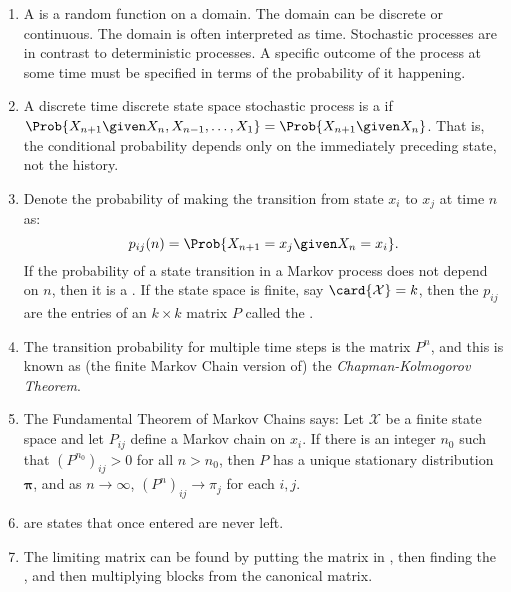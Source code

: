 \documentclass[12pt]{article}
\begin{document}
\begin{enumerate}
    \item
        A  is%
        a random function on a domain.  The domain can be discrete or
        continuous.  The domain is often interpreted as time.  Stochastic
        processes are in contrast to deterministic processes.  A specific
        outcome of the process at some time must be specified in terms of
        the probability of it happening.
    \item
        A discrete time discrete state space stochastic process is a
         if \( \Prob{X_{n+1} \given X_n, X_{n-1},
        \dots, X_1} = \Prob{X_{n+1} \given X_n} \).  That is, the
        conditional probability depends only on the immediately
        preceding state, not the history.
    \item
        Denote the probability of making the transition from state \( x_i
        \) to \( x_j \) at time \( n \) as:
        \[
            p_{ij}(n)=\Prob{X_{n+1}=x_j \given X_{n}=x_i}.
        \] If the probability of a state transition in a Markov process
        does not depend on \( n \), then it is a .  If the state space is finite, say \( \card{\mathcal
        {X}} = k \), then the \( p_{ij} \) are the entries of an \( k
        \times k \) matrix \( P \) called the .
    \item
        The transition probability for multiple time steps is the matrix
        \( P^n \), and this is known as (the finite Markov Chain version
        of) the \textit{Chapman-Kolmogorov Theorem}.
    \item
        The Fundamental Theorem of Markov Chains says:  Let \( \mathcal{X}
        \) be a finite state space and let \( P_{ij} \) define a Markov
        chain on \( x_i \).  If there is an integer \( n_0 \) such that \(
        (P^{n_0})_{ij} > 0 \) for all \( n > n_0 \), then \( P \) has a
        unique stationary distribution \( \mathbf{\pi} \), and as \( n
        \to \infty \), \( (P^n)_{ij} \to \pi_{j} \) for each \( i,j \).
    \item
         are states that once entered are never
        left.
    \item
        The limiting matrix can be found by putting the matrix in , then finding the , and then
        multiplying blocks from the canonical matrix.
\end{enumerate}
\end{document}

